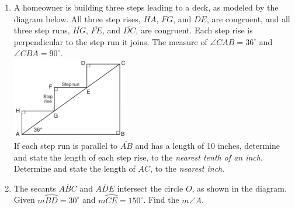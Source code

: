 \documentclass[12pt, twoside]{article}
\begin{document}
\begin{enumerate}
  \item A homeowner is building three steps leading to a deck, as modeled by the diagram below. All three step rises, $\overline{HA}$,  $\overline{FG}$, and  $\overline{DE}$, are congruent, and all three step runs, $\overline{HG}$,  $\overline{FE}$, and  $\overline{DC}$, are congruent. Each step rise is perpendicular to the step run it joins. The measure of $\angle CAB = 36^\circ$ and $\angle CBA = 90^\circ$.\\[0.5cm]
    \includegraphics[width=0.4\textwidth]{steps_Aug2018-33.png}\\
  If each step run is parallel to $\overline{AB}$ and has a length of 10 inches, determine and state the length of each step rise, to the \emph{nearest tenth of an inch}.\\[3cm]
  Determine and state the length of $\overline{AC}$, to the \emph{nearest inch}.

\newpage
  \item The secants $\overline{ABC}$ and $\overline{ADE}$ intersect the circle $O$, as shown in the diagram. \\Given $m \wideparen{BD}=30^\circ$ and $m \wideparen{CE}=150^\circ$. Find the $m\angle A$.
       \begin{center}
     \end{center} \vspace{2cm}


\end{enumerate}
\end{document}
